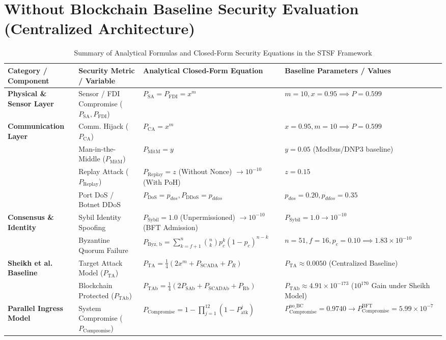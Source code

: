 \documentclass[10pt,twocolumn,journal]{IEEEtran}
\begin{document}
\section{Without Blockchain Baseline Security Evaluation (Centralized Architecture)}


\begin{table}[htbp]
\caption{Summary of Analytical Formulas and Closed-Form Security Equations in the STSF Framework}
\label{tab:all_formulas}
\centering
\scriptsize
\begin{tabular}{@{}llll@{}}
\toprule
\textbf{Category / Component} & \textbf{Security Metric / Variable} & \textbf{Analytical Closed-Form Equation} & \textbf{Baseline Parameters / Values} \\
\midrule
\textbf{Physical \& Sensor Layer} & Sensor / FDI Compromise ($P_{\text{SA}}, P_{\text{FDI}}$) & $P_{\text{SA}} = P_{\text{FDI}} = x^m$ & $m=10, x=0.95 \implies P=0.599$ \\
\textbf{Communication Layer} & Comm. Hijack ($P_{\text{CA}}$) & $P_{\text{CA}} = x^m$ & $x=0.95, m=10 \implies P=0.599$ \\
& Man-in-the-Middle ($P_{\text{MitM}}$) & $P_{\text{MitM}} = y$ & $y=0.05$ (Modbus/DNP3 baseline) \\
& Replay Attack ($P_{\text{Replay}}$) & $P_{\text{Replay}} = z$ (Without Nonce) $\to 10^{-10}$ (With PoH) & $z=0.15$ \\
& Port DoS / Botnet DDoS & $P_{\text{DoS}} = p_{dos}, P_{\text{DDoS}} = p_{ddos}$ & $p_{dos}=0.20, p_{ddos}=0.35$ \\
\textbf{Consensus \& Identity} & Sybil Identity Spoofing & $P_{\text{Sybil}} = 1.0$ (Unpermissioned) $\to 10^{-10}$ (BFT Admission) & $P_{\text{Sybil}}=1.0 \to 10^{-10}$ \\
& Byzantine Quorum Failure & $P_{\text{Byz, b}} = \sum_{k=f+1}^{n} \binom{n}{k} p_c^k (1-p_c)^{n-k}$ & $n=51, f=16, p_c=0.10 \implies 1.83 \times 10^{-10}$ \\
\textbf{Sheikh et al. Baseline} & Target Attack Model ($P_{\text{TA}}$) & $P_{\text{TA}} = \frac{1}{4}\left(2x^m + P_{\text{SCADA}} + P_R\right)$ & $P_{\text{TA}} \approx 0.0050$ (Centralized Baseline) \\
& Blockchain Protected ($P_{\text{TAb}}$) & $P_{\text{TAb}} = \frac{1}{4}\left(2P_{\text{SAb}} + P_{\text{SCADAb}} + P_{\text{Rb}}\right)$ & $P_{\text{TAb}} \approx 4.91 \times 10^{-173}$ ($10^{170}$ Gain under Sheikh Model) \\
\textbf{Parallel Ingress Model} & System Compromise ($P_{\text{Compromise}}$) & $P_{\text{Compromise}} = 1 - \prod_{j=1}^{12} \left(1 - P_{\text{atk}}^j\right)$ & $P_{\text{Compromise}}^{\text{no\_BC}} = 0.9740 \to P_{\text{Compromise}}^{\text{BFT}} = 5.99 \times 10^{-7}$ \\

\end{tabular}
\end{table}
\end{document}
